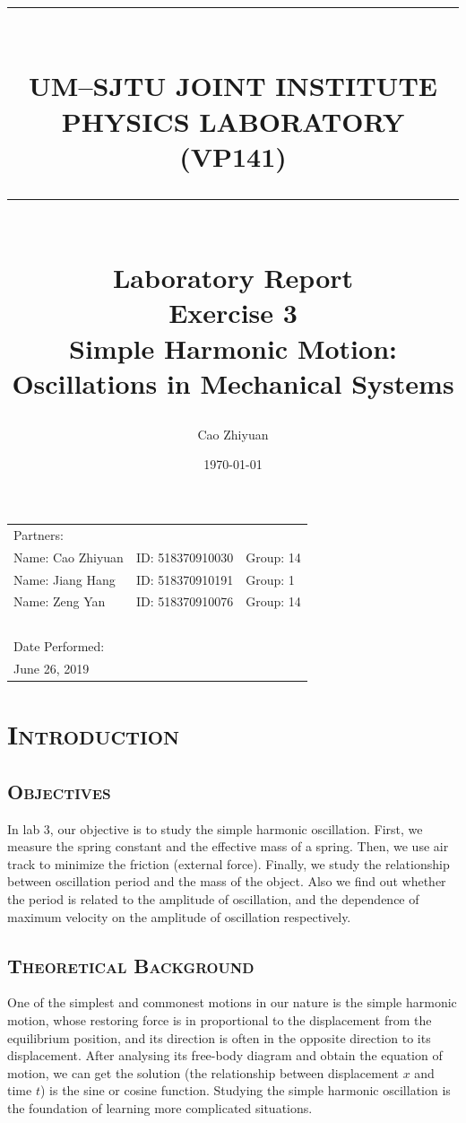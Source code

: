 \documentclass[a4paper,12pt]{article}
\title{ \rule{\textwidth}{0.3mm} \\UM–SJTU JOINT INSTITUTE \\ PHYSICS LABORATORY \\ (VP141) \\ \rule{\textwidth}{0.3mm} \\ [30 mm]  \Large{Laboratory Report} \\[5 mm]  Exercise 3 \\[1 mm] Simple Harmonic Motion: \\ Oscillations in Mechanical Systems\\[5 mm]} %
\author{Cao Zhiyuan} %
\date{\today} %
\begin{document}
\scshape

\maketitle %

\begin{center}
\begin{tabular}{l l l}
\\[6 mm]
Partners:  \\
Name: Cao Zhiyuan & ID: 518370910030 & Group: 14 \\
Name: Jiang Hang & ID: 518370910191 & Group: 1 \\
Name: Zeng Yan & ID: 518370910076 & Group: 14 \\
~\\
Date Performed:\\
June 26, 2019\\
\end{tabular}
\end{center}

\thispagestyle{empty}


\newpage


\small\tableofcontents
\thispagestyle{empty}


\newpage


\setcounter{page}{1}
\upshape
\section{\textsc{Introduction}}
\subsection{\textsc{Objectives}}
In lab 3, our objective is to study the simple harmonic oscillation. First, we measure the spring constant and the effective mass of a spring. Then, we use air track to minimize the friction (external force). 
Finally, we study the relationship between oscillation period and the mass of the object. Also we find out whether the period is related to the amplitude of oscillation, and the dependence of maximum velocity on the amplitude of oscillation respectively.
\subsection{\textsc{Theoretical Background}}
One of the simplest and commonest motions in our nature is the simple harmonic motion, whose restoring force is in proportional to the displacement from the equilibrium position, and its direction is often in the opposite direction to its displacement. After analysing its free-body diagram and obtain the equation of motion, we can get the solution (the relationship between displacement $x$ and time $t$) is the sine or cosine function. Studying the simple harmonic oscillation is the foundation of learning more complicated situations.
\end{document}
